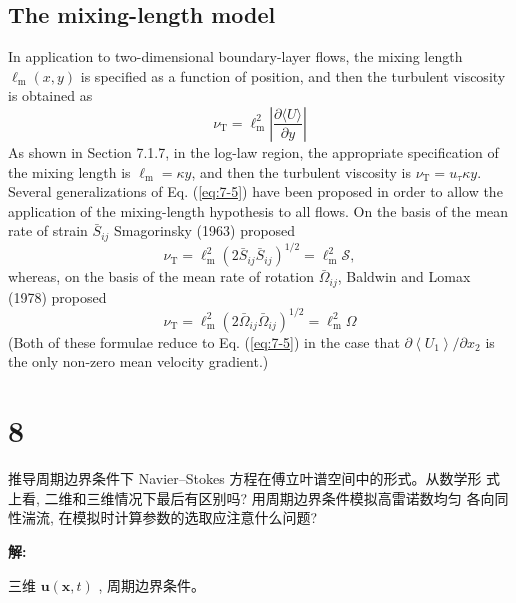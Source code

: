 \documentclass[12pt,a4]{ctexart}
\begin{document}
\subsection{The mixing-length model}

In application to two-dimensional boundary-layer flows, the mixing length $\ell_{\mathrm{m}}(x, y)$ is specified as a function of position, and then the turbulent viscosity is obtained as
\begin{equation}
   \nu_{\mathrm{T}}=\ell_{\mathrm{m}}^{2}\left|\frac{\partial\langle U\rangle}{\partial y}\right|
   \label{eq:7-5}
\end{equation}
As shown in Section 7.1.7, in the log-law region, the appropriate specification of the mixing length is $\ell_{\mathrm{m}}=\kappa y$, and then the turbulent viscosity is $\nu_{\mathrm{T}}=u_{\tau} \kappa y$.
Several generalizations of Eq. (\ref{eq:7-5}) have been proposed in order to allow the application of the mixing-length hypothesis to all flows. On the basis of the mean rate of strain $\bar{S}_{i j}$ Smagorinsky (1963) proposed
\begin{equation}
   \nu_{\mathrm{T}}=\ell_{\mathrm{m}}^{2}\left(2 \bar{S}_{i j} \bar{S}_{i j}\right)^{1 / 2}=\ell_{\mathrm{m}}^{2} \mathcal{S},
\end{equation}
whereas, on the basis of the mean rate of rotation $\bar{\Omega}_{i j}$, Baldwin and Lomax (1978) proposed
\begin{equation}
   \nu_{\mathrm{T}}=\ell_{\mathrm{m}}^{2}\left(2 \bar{\Omega}_{i j} \bar{\Omega}_{i j}\right)^{1 / 2}=\ell_{\mathrm{m}}^{2} \Omega
\end{equation}
(Both of these formulae reduce to Eq. (\ref{eq:7-5}) in the case that $\partial\left\langle U_{1}\right\rangle / \partial x_{2}$ is the only non-zero mean velocity gradient.)


\section{8}

推导周期边界条件下 Navier--Stokes 方程在傅立叶谱空间中的形式。从数学形 式上看, 二维和三维情况下最后有区别吗? 用周期边界条件模拟高雷诺数均匀 各向同性湍流, 在模拟时计算参数的选取应注意什么问题?


\textsf{\hspace{-2em}\sf  \textbf{解:}}

三维 $\bm{u} (\bm{x} ,t)$ , 周期边界条件。\citep[P211]{pop}
\end{document}
